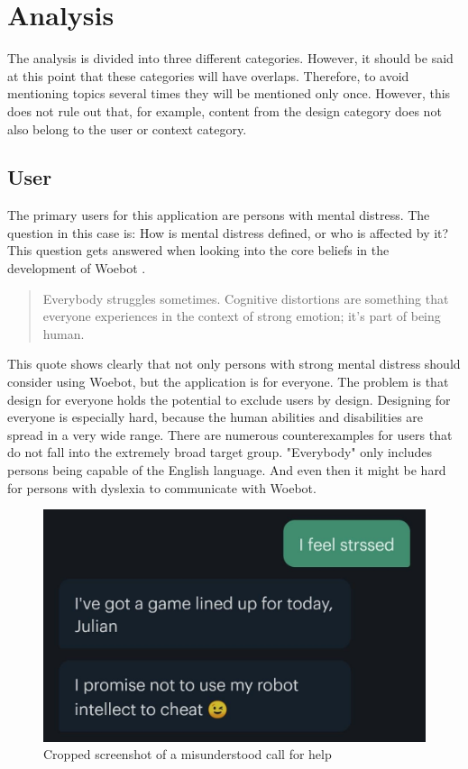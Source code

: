 \section{Analysis}\label{sec:analysis}
The analysis is divided into three different categories.
However, it should be said at this point that these categories will have overlaps.
Therefore, to avoid mentioning topics several times they will be mentioned only once.
However, this does not rule out that, for example, content from the design category does not also belong to the user or context category.

\subsection{User}
The primary users for this application are persons with mental distress.
The question in this case is: How is mental distress defined, or who is affected by it?
This question gets answered when looking into the core beliefs in the development of Woebot \cite{woebot-beliefs}.

\begin{quote}
    Everybody struggles sometimes. Cognitive distortions are something that everyone experiences in the context of strong emotion; it's part of being human.
\end{quote}

This quote shows clearly that not only persons with strong mental distress should consider using Woebot, but the application is for everyone.
The problem is that design for everyone holds the potential to exclude users by design\cite{feminist-technology}.
Designing for everyone is especially hard, because the human abilities and disabilities are spread in a very wide range.
There are numerous counterexamples for users that do not fall into the extremely broad target group.
"Everybody" only includes persons being capable of the English language.
And even then it might be hard for persons with dyslexia to communicate with Woebot.\\

\begin{figure}[ht]
    \begin{center}
        \includegraphics[width=1\columnwidth]{files/dyslexia.png}
        \caption{\label{fig:dyslexia} Cropped screenshot of a misunderstood call for help}
    \end{center}
\end{figure}

